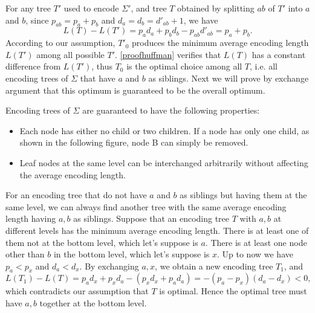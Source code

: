 For any tree $T'$ used to encode $\Sigma'$, and tree $T$ obtained by splitting $ab$ of $T'$ into $a$ and $b$, since $p_{ab}=p_a+p_b$ and $d_{a}=d_{b}=d'_{ab}+1$, we have 
\begin{equation}\label{proofhuffman}
L(T)-L(T')=p_ad_a+p_bd_b-p_{ab}d'_{ab}=p_a+p_b.
\end{equation}
According to our assumption, $T'_0$ produces the minimum average encoding length $L(T')$ among all possible $T'$. \eqref{proofhuffman} verifies that $L(T)$ has a constant difference from $L(T')$, thus $T_0$ is the optimal choice among all $T$, i.e. all encoding trees of $\Sigma$ that have $a$ and $b$ as siblings. Next we will prove by exchange argument that this optimum is guaranteed to be the overall optimum.

Encoding trees of $\Sigma$ are guaranteed to have the following properties:
\begin{itemize}
\item Each node has either no child or two children. If a node has only one child, as shown in the following figure, node B can simply be removed.\\
\begin{figure}[H]
\centering
{} 
\end{figure}
\item Leaf nodes at the same  level can be interchanged arbitrarily without affecting the average encoding length. 
\end{itemize}

For an encoding tree that do not have $a$ and $b$ as siblings but having them at the same level, we can always find another tree with the same average encoding length having $a,b$ as siblings. Suppose that an encoding tree $T$ with $a,b$ at different levels has the minimum average encoding length. There is at least one of them not at the bottom level, which let's suppose is $a$. There is at least one node other than $b$ in the bottom level, which let's suppose is $x$. Up to now we have $p_a<p_x$ and $d_a<d_x$. By exchanging $a,x$, we obtain a new encoding tree $T_1$, and 
$$L(T_1)-L(T)=p_ad_x+p_xd_a-(p_xd_x+p_ad_a)=-(p_a-p_x)(d_a-d_x)<0,$$
which contradicts our assumption that $T$ is optimal. Hence the optimal tree must have $a,b$ together at the bottom level.

